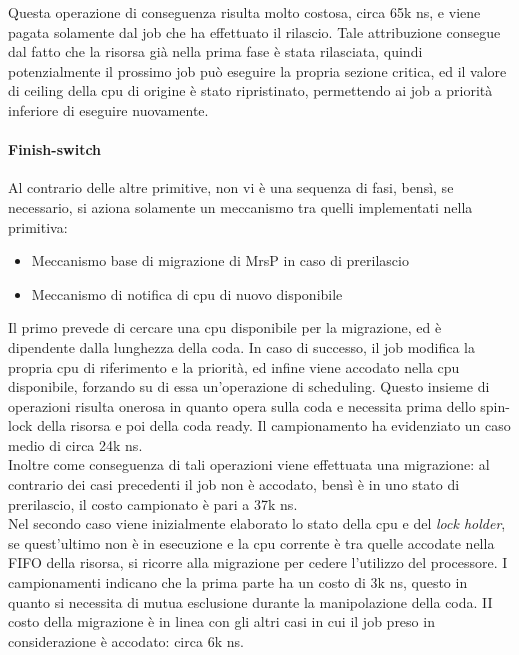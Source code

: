 \noindent Questa operazione di conseguenza risulta molto costosa, circa 65k ns, e viene pagata solamente dal job che ha effettuato il rilascio. Tale attribuzione consegue dal fatto che la risorsa già nella prima fase è stata rilasciata, quindi potenzialmente il prossimo job può eseguire la propria sezione critica, ed il valore di ceiling della cpu di origine è stato ripristinato, permettendo ai job a priorità inferiore di eseguire nuovamente.

\paragraph{Finish-switch} Al contrario delle altre primitive, non vi è una sequenza di fasi, bensì, se necessario, si aziona solamente un meccanismo tra quelli implementati nella primitiva:

\begin{itemize}
	\item Meccanismo base di migrazione di MrsP in caso di prerilascio
	\item Meccanismo di notifica di cpu di nuovo disponibile
\end{itemize}

\noindent Il primo prevede di cercare una cpu disponibile per la migrazione, ed è dipendente dalla lunghezza della coda. In caso di successo, il job modifica la propria cpu di riferimento e la priorità, ed infine viene accodato nella cpu disponibile, forzando su di essa un'operazione di scheduling. Questo insieme di operazioni risulta onerosa in quanto opera sulla coda e necessita prima dello spin-lock della risorsa e poi della coda ready. Il campionamento ha evidenziato un caso medio di circa 24k ns.\\

\noindent Inoltre come conseguenza di tali operazioni viene effettuata una migrazione: al contrario dei casi precedenti il job non è accodato, bensì è in uno stato di prerilascio, il costo campionato è pari a 37k ns.\\

\noindent Nel secondo caso viene inizialmente elaborato lo stato della cpu e del \textit{lock holder}, se quest'ultimo non è in esecuzione e la cpu corrente è tra quelle accodate nella FIFO della risorsa, si ricorre alla migrazione per cedere l'utilizzo del processore. I campionamenti indicano che la prima parte ha un costo di 3k ns, questo in quanto si necessita di mutua esclusione durante la manipolazione della coda. II costo della migrazione è in linea con gli altri casi in cui il job preso in considerazione è accodato: circa 6k ns.\\


